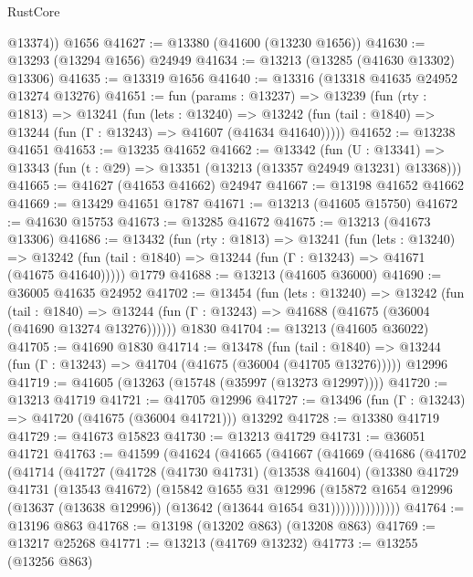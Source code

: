 \begin{lexlean}{RustCore}
\begin{coremodule}
        @13374))
    @1656
@41627 := @13380 (@41600 (@13230 @1656))
@41630 := @13293 (@13294 @1656) @24949
@41634 := @13213 (@13285 (@41630 @13302) @13306)
@41635 := @13319 @1656
@41640 := @13316 (@13318 @41635 @24952 @13274 @13276)
@41651 := fun (params : @13237) =>
  @13239
    (fun (rty : @1813) =>
    @13241
      (fun (lets : @13240) =>
      @13242 (fun (tail : @1840) => @13244 (fun (Γ : @13243) => @41607 (@41634 @41640)))))
@41652 := @13238 @41651
@41653 := @13235 @41652
@41662 := @13342
    (fun (U : @13341) => @13343 (fun (t : @29) => @13351 (@13213 (@13357 @24949 @13231) @13368)))
@41665 := @41627 (@41653 @41662) @24947
@41667 := @13198 @41652 @41662
@41669 := @13429 @41651 @1787
@41671 := @13213 (@41605 @15750)
@41672 := @41630 @15753
@41673 := @13285 @41672
@41675 := @13213 (@41673 @13306)
@41686 := @13432
    (fun (rty : @1813) =>
    @13241
      (fun (lets : @13240) =>
      @13242 (fun (tail : @1840) => @13244 (fun (Γ : @13243) => @41671 (@41675 @41640)))))
    @1779
@41688 := @13213 (@41605 @36000)
@41690 := @36005 @41635 @24952
@41702 := @13454
    (fun (lets : @13240) =>
    @13242
      (fun (tail : @1840) =>
      @13244 (fun (Γ : @13243) => @41688 (@41675 (@36004 (@41690 @13274 @13276))))))
    @1830
@41704 := @13213 (@41605 @36022)
@41705 := @41690 @1830
@41714 := @13478
    (fun (tail : @1840) => @13244 (fun (Γ : @13243) => @41704 (@41675 (@36004 (@41705 @13276)))))
    @12996
@41719 := @41605 (@13263 (@15748 (@35997 (@13273 @12997))))
@41720 := @13213 @41719
@41721 := @41705 @12996
@41727 := @13496 (fun (Γ : @13243) => @41720 (@41675 (@36004 @41721))) @13292
@41728 := @13380 @41719
@41729 := @41673 @15823
@41730 := @13213 @41729
@41731 := @36051 @41721
@41763 := @41599
    (@41624
      (@41665
        (@41667
          (@41669
            (@41686
              (@41702
                (@41714
                  (@41727
                    (@41728
                      (@41730 @41731)
                      (@13538 @41604)
                      (@13380
                        @41729
                        @41731
                        (@13543 @41672)
                        (@15842
                          @1655
                          @31
                          @12996
                          (@15872
                            @1654
                            @12996
                            (@13637 (@13638 @12996))
                            (@13642 (@13644 @1654 @31))))))))))))))
@41764 := @13196 @863
@41768 := @13198 (@13202 @863) (@13208 @863)
@41769 := @13217 @25268
@41771 := @13213 (@41769 @13232)
@41773 := @13255 (@13256 @863)

\end{coremodule}
\end{lexlean}

